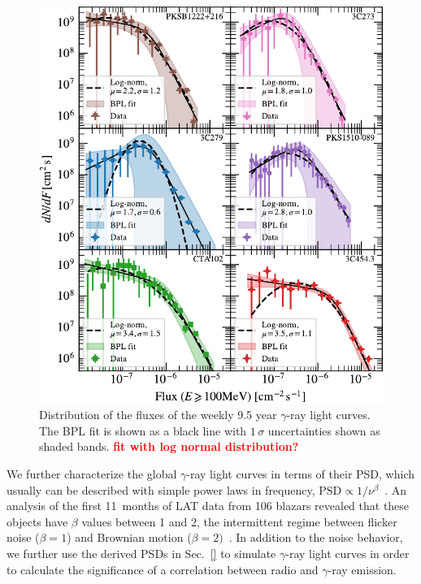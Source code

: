 \documentclass[twocolumn,linenumbers]{aastex62}
\newcommand{\gray}{$\gamma$-ray\xspace}
\newcommand{\todo}[1]{\textbf{\textcolor{red}{#1}}}
\begin{document}
\begin{figure}
    \includegraphics[width = .99\linewidth]{figures/fluxdist_weekly_tsmin9.pdf}
    \caption{\label{fig:fluxpdf} Distribution of the fluxes of the weekly 9.5 year \gray light curves. The BPL fit is shown as a black line with $1\,\sigma$ uncertainties shown as shaded bands. \todo{fit with log normal distribution?}}
\end{figure}

We further characterize the global \gray light curves in terms of their PSD,
which usually can be described with simple power laws in frequency,  $\mathrm{PSD} \propto 1 / \nu^\beta$~\citep{}.
An analysis of the first 11~months of LAT data from 106 blazars revealed that 
these objects have $\beta$ values between 1 and 2, the intermittent regime between flicker noise ($\beta = 1$) and Brownian motion ($\beta = 2)$~\citep{2010ApJ...722..520A}. 
In addition to the noise behavior, 
we further use the derived PSDs in Sec.~\ref{} to simulate \gray light curves in order to calculate the significance of a correlation between radio and \gray emission. 
\end{document}
